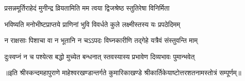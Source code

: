 \twolineshloka
{प्रसन्नमूर्तिराहेदं मुनीन्द्र व्रियतामिति}
{मम त्वया द्विजश्रेष्ठ स्तुतिरेषा विनिर्मिता}

\twolineshloka
{भविष्यति मनोभीष्टप्राप्तये प्राणिनां भुवि}
{विवर्धते कुले लक्ष्मीस्तस्य यः प्रपठेदिमम्}

\twolineshloka
{न राक्षसाः पिशाचा वा न भूतानि न चऽऽपदः}
{विघ्नकारीणि तद्गेहे यत्रैवं संस्तुवन्ति माम्}

\twolineshloka
{दुःस्वप्नं न च पश्येत्स बद्धो मुच्येत बन्धनात्}
{स्तवस्यास्य प्रभावेण दिव्यभावः पुमान्भवेत्}

{॥इति श्रीस्कन्दमहापुराणे माहेश्वरखण्डान्तर्गते कुमारिकाखण्डे श्रीकार्तिकेयाष्टोत्तरशतनामस्तोत्रं सम्पूर्णम्॥}